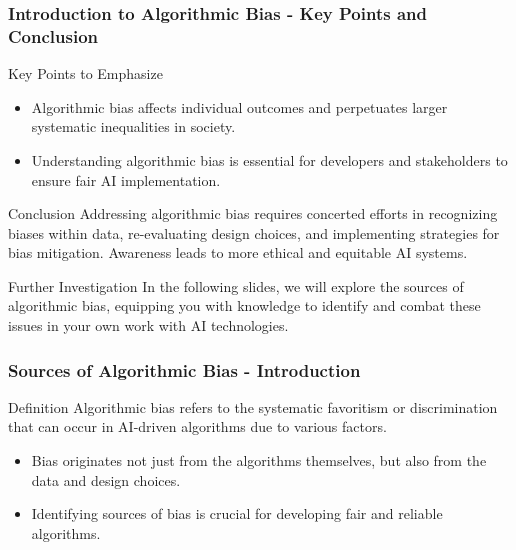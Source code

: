 \documentclass{beamer}
\begin{document}
\begin{frame}[fragile]
    \frametitle{Introduction to Algorithmic Bias - Key Points and Conclusion}
    \begin{block}{Key Points to Emphasize}
        \begin{itemize}
            \item Algorithmic bias affects individual outcomes and perpetuates larger systematic inequalities in society.
            \item Understanding algorithmic bias is essential for developers and stakeholders to ensure fair AI implementation.
        \end{itemize}
    \end{block}
    
    \begin{block}{Conclusion}
        Addressing algorithmic bias requires concerted efforts in recognizing biases within data, re-evaluating design choices, and implementing strategies for bias mitigation. Awareness leads to more ethical and equitable AI systems.
    \end{block}
    
    \begin{block}{Further Investigation}
        In the following slides, we will explore the sources of algorithmic bias, equipping you with knowledge to identify and combat these issues in your own work with AI technologies.
    \end{block}
\end{frame}

\begin{frame}[fragile]
    \frametitle{Sources of Algorithmic Bias - Introduction}
    \begin{block}{Definition}
    Algorithmic bias refers to the systematic favoritism or discrimination that can occur in AI-driven algorithms due to various factors.
    \end{block}
    \begin{itemize}
        \item Bias originates not just from the algorithms themselves, but also from the data and design choices.
        \item Identifying sources of bias is crucial for developing fair and reliable algorithms.
    \end{itemize}
\end{frame}
\end{document}
